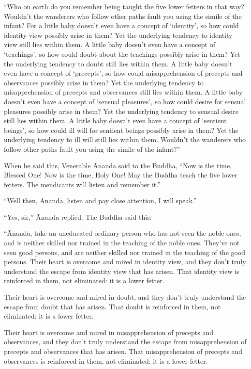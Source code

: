 \documentclass[12pt,openany]{book}%
\begin{document}
“Who on earth do you remember being taught the five lower fetters in that way? Wouldn’t the wanderers who follow other paths fault you using the simile of the infant? For a little baby doesn’t even have a concept of ‘identity’, so how could identity view possibly arise in them? Yet the underlying tendency to identity view still lies within them. A little baby doesn’t even have a concept of ‘teachings’, so how could doubt about the teachings possibly arise in them? Yet the underlying tendency to doubt still lies within them. A little baby doesn’t even have a concept of ‘precepts’, so how could misapprehension of precepts and observances possibly arise in them? Yet the underlying tendency to misapprehension of precepts and observances still lies within them. A little baby doesn’t even have a concept of ‘sensual pleasures’, so how could desire for sensual pleasures possibly arise in them? Yet the underlying tendency to sensual desire still lies within them. A little baby doesn’t even have a concept of ‘sentient beings’, so how could ill will for sentient beings possibly arise in them? Yet the underlying tendency to ill will still lies within them. Wouldn’t the wanderers who follow other paths fault you using the simile of the infant?” 

When he said this, Venerable Ānanda said to the Buddha, “Now is the time, Blessed One! Now is the time, Holy One! May the Buddha teach the five lower fetters. The mendicants will listen and remember it.” 

“Well then, Ānanda, listen and pay close attention, I will speak.” 

“Yes, sir,” Ānanda replied. The Buddha said this: 

“Ānanda, take an uneducated ordinary person who has not seen the noble ones, and is neither skilled nor trained in the teaching of the noble ones. They’ve not seen good persons, and are neither skilled nor trained in the teaching of the good persons. Their heart is overcome and mired in identity view, and they don’t truly understand the escape from identity view that has arisen. That identity view is reinforced in them, not eliminated: it is a lower fetter. 

Their heart is overcome and mired in doubt, and they don’t truly understand the escape from doubt that has arisen. That doubt is reinforced in them, not eliminated: it is a lower fetter. 

Their heart is overcome and mired in misapprehension of precepts and observances, and they don’t truly understand the escape from misapprehension of precepts and observances that has arisen. That misapprehension of precepts and observances is reinforced in them, not eliminated: it is a lower fetter. 
\end{document}
